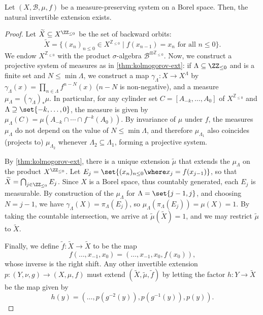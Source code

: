\documentclass[../main]{subfiles}
\begin{document}

\begin{theorem}
  Let \((X,\mathcal{B},\mu,f)\) be a measure-preserving system on a Borel space. Then, the natural invertible extension exists.
\end{theorem}

\begin{proof}
  Let \(\widetilde{X} \subseteq X^{\ZZ_{\le 0}}\) be the set of backward orbits:
  \begin{equation*}
    \tilde{X} = \{ (x_n)_{n \le 0} \in X^{\mathbb{Z}_{\le 0}} \mid f(x_{n-1}) = x_n \text{ for all } n \le 0 \}.
  \end{equation*}
  We endow $X^{\mathbb{Z}_{\le 0}}$ with the product $\sigma$-algebra $\mathcal{B}^{\otimes \mathbb{Z}_{\le 0}}$. Now, we construct a projective system of measures as in \cref{thm:kolmogorov-ext}: if \(\Lambda \subseteq \ZZ_{\le 0}\) and is a finite set and  \(N \le \min \Lambda\), we construct a map \(\gamma_{\Lambda} \colon X \to X^{\Lambda}\) by \(\gamma_{\Lambda}(x) = \prod_{n \in \Lambda}f^{n - N}(x)\) (\(n - N\) is non-negative), and a measure \(\mu_{\Lambda} = (\gamma_{\Lambda})_*\mu\). In particular, for any cylinder set \(C = [A_{-k},\dots,A_0]\) of \(X^{\mathbb{Z}_{\le 0}}\) and \(\Lambda \supseteq \set{-k,\dots,0}\), the measure is given by \(\mu_{\Lambda}(C) = \mu(A_{-k} \cap \cdots \cap f^{-k}(A_0))\). By invariance of \(\mu\) under \(f\), the measures \(\mu_{\Lambda}\) do not depend on the value of \(N \le \min \Lambda\), and therefore \(\mu_{\Lambda_1}\) also coincides (projects to) \(\mu_{\Lambda_2}\) whenever \(\Lambda_2 \subseteq \Lambda_1\), forming a projective system.

  By \cref{thm:kolmogorov-ext}, there is a unique extension \(\tilde{\mu}\) that extends the \(\mu_{\Lambda}\) on the product \(X^{\ZZ_{\le 0}}\). Let \(E_j = \set{ (x_n)_{n \le 0} \where x_j = f(x_{j - 1})}\), so that \(\widetilde{X} = \bigcap_{j \in \ZZ_{\le 0}}E_j\). Since \(X\) is a Borel space, thus countably generated, each \(E_j\) is measurable. By construction of the \(\mu_{\Lambda}\) for \(\Lambda = \set{j - 1,j}\), and choosing \(N = j - 1\), we have \(\gamma_{\Lambda}(X) = \pi_{\Lambda}(E_j)\), so \(\mu_{\Lambda}(\pi_{\Lambda}(E_j)) = \mu(X) = 1\). By taking the countable intersection, we arrive at \(\tilde{\mu}(\widetilde{X}) = 1\), and we may restrict \(\tilde{\mu}\) to \(\widetilde{X}\).

  Finally, we define \(\tilde{f} \colon \widetilde{X} \to \widetilde{X}\) to be the map \[f(\dots,x_{-1},x_0) = (\dots,x_{-1},x_0,f(x_0)),\] whose inverse is the right shift. Any other invertible extension \(p \colon (Y,\nu,g) \to (X,\mu,f)\) must extend \((\widetilde{X}, \tilde{\mu},\tilde{f})\) by letting the factor \(h \colon Y \to \widetilde{X}\) be the map given by \[h(y) = (\dots,p(g^{-2}(y)),p(g^{-1}(y)),p(y)).\]
\end{proof}
\end{document}
